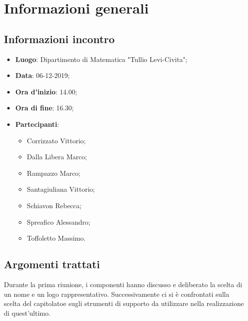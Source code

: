 \section{Informazioni generali}
    \subsection{Informazioni incontro}
        \begin{itemize}
            \item \textbf{Luogo}: Dipartimento di Matematica "Tullio Levi-Civita";
            \item \textbf{Data}: 06-12-2019;
            \item \textbf{Ora d'inizio}: 14.00;
            \item \textbf{Ora di fine}: 16.30;
            \item \textbf{Partecipanti}: \begin{itemize}
                \item Corrizzato Vittorio;
                \item Dalla Libera Marco;
                \item Rampazzo Marco;
                \item Santagiuliana Vittorio;
                \item Schiavon Rebecca;
                \item Spreafico Alessandro;
                \item Toffoletto Massimo.
            \end{itemize}
        \end{itemize}
    \subsection{Argomenti trattati}
        Durante la prima riunione, i componenti hanno discusso e deliberato la scelta di un nome e un logo rappresentativo.
        Successivamente ci si è confrontati sulla scelta del capitolato\glosp e sugli strumenti di supporto da utilizzare nella realizzazione
        di quest'ultimo.
